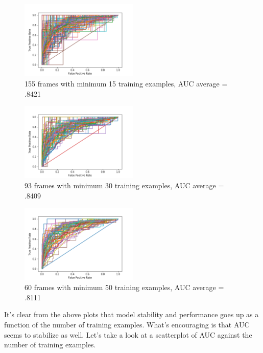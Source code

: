 \documentclass[a4paper]{article}
\begin{document}
\begin{figure}[H]
\centering
\includegraphics[width=0.5\textwidth]{auc_plot15.png}
\caption{\label{fig:frog} 155 frames with minimum 15 training examples, AUC average = .8421}
\end{figure}

\begin{figure}[H]
\centering
\includegraphics[width=0.5\textwidth]{auc_plot30.png}
\caption{\label{fig:frog} 93 frames with minimum 30 training examples, AUC average = .8409}
\end{figure}

\begin{figure}[H]
\centering
\includegraphics[width=0.5\textwidth]{auc_plot50.png}
\caption{\label{fig:frog} 60 frames with minimum 50 training examples, AUC average = .8111}
\end{figure}

It's clear from the above plots that model stability and performance goes up as a function of the number of training examples. What's encouraging is that AUC seems to stabilize as well. Let's take a look at a scatterplot of AUC against the number of training examples.
\end{document}
